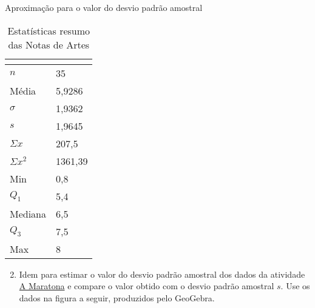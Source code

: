 {{{\begin{task}{Aproximação para o valor do desvio padrão amostral}
\begin{enumerate}
\end{enumerate}

\begin{table}[H]
\centering
\begin{tabular}{|l|l|}
\hline
\multicolumn{2}{|c|}{\cellcolor{\currentcolor!80}{\textcolor{white}{\textbf{Estatística}}}}\\
\hline
$n$ & 35 \\
\hline
Média & 5,9286 \\
\hline
$\sigma$ & 1,9362 \\
\hline
$s$ & 1,9645 \\
\hline
$\Sigma x$ & 207,5 \\
\hline
$\Sigma x^2$ & 1361,39 \\
\hline
Min & 0,8 \\
\hline
$Q_1$ & 5,4 \\
\hline
Mediana & 6,5 \\
\hline
$Q_3$ & 7,5 \\
\hline
Max & 8 \\
\hline
\end{tabular}
\caption{Estatísticas resumo das Notas de Artes}\label{\detokenize{PE104-5:fig-resumonartes}}\label{\detokenize{PE104-5:id2}}
\end{table}

\begin{enumerate}
\setcounter{enumi}{1}
\item {} 
Idem para estimar o valor do desvio padrão amostral dos dados da atividade \hyperref[\detokenize{PE104-0:ativ-maratona-de-ny}]{A Maratona} e compare o valor obtido com o desvio padrão amostral \(s\). Use os dados na figura a seguir, produzidos pelo GeoGebra.

\end{enumerate}


\end{task}}}}
